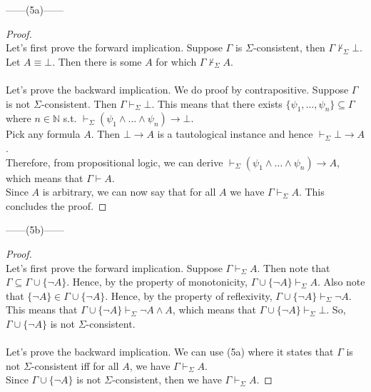 \documentclass[12pt]{article}
\begin{document}
\newpage
\noindent
\begin{center}
    ------(5a)------
\end{center} 
\begin{proof} $ $\\
    Let's first prove the forward implication.
    Suppose $\Gamma$ is $\Sigma$-consistent, then $\Gamma \nvdash_{\Sigma} \bot$.
    Let $A \equiv \bot$. Then there is some $A$ for which $\Gamma \nvdash_{\Sigma} A$.\\
    \\
    Let's prove the backward implication. We do proof by contrapositive.
    Suppose $\Gamma$ is not $\Sigma$-consistent. Then $\Gamma \vdash_{\Sigma} \bot$.
    This means that there exists $\{\psi_1, \dots, \psi_n \} \subseteq \Gamma$ where $n \in \mathbb{N}$ s.t. $\vdash_{\Sigma} (\psi_1 \land \dots \land \psi_n) \to \bot$.\\
    Pick any formula $A$. Then $\bot \to A$ is a tautological instance and hence $\vdash_{\Sigma} \bot \to A$.\\
    Therefore, from propositional logic, we can derive $\vdash_{\Sigma} (\psi_1 \land \dots \land \psi_n) \to A$, which means that $\Gamma \vdash A$.\\
    Since $A$ is arbitrary, we can now say that for all $A$ we have $\Gamma \vdash_{\Sigma} A$. This concludes the proof.
\end{proof}

\noindent
\begin{center}
    ------(5b)------
\end{center} 
\begin{proof} $ $\\
    Let's first prove the forward implication.
    Suppose $\Gamma \vdash_{\Sigma} A$. 
    Then note that $\Gamma \subseteq \Gamma \cup \{\neg A\}$.
    Hence, by the property of monotonicity, $\Gamma \cup \{\neg A\} \vdash_{\Sigma} A$.
    Also note that $\{\neg A\} \in \Gamma \cup \{\neg A\}$.
    Hence, by the property of reflexivity, $\Gamma \cup \{\neg A\} \vdash_{\Sigma} \neg A$.\\
    This means that $\Gamma \cup \{\neg A\} \vdash_{\Sigma} \neg A \land A$, which means that $\Gamma \cup \{\neg A\} \vdash_{\Sigma} \bot$.
    So, $\Gamma \cup \{\neg A\}$ is not $\Sigma$-consistent.\\
    \\
    Let's prove the backward implication.
    We can use (5a) where it states that $\Gamma$ is not $\Sigma$-consistent iff for all $A$, we have $\Gamma \vdash_{\Sigma} A$.\\
    Since $\Gamma \cup \{\neg A\}$ is not $\Sigma$-consistent, then we have $\Gamma \vdash_{\Sigma} A$.

\end{proof}
\end{document}
